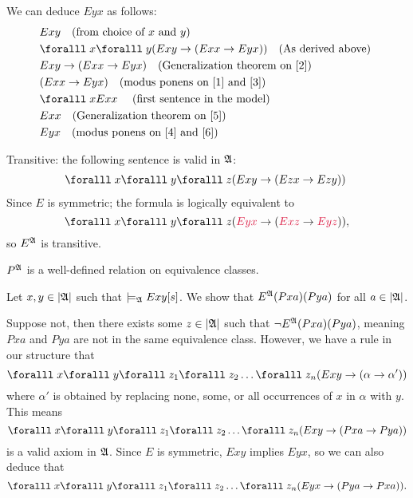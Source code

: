 \begin{Answer}
\begin{enumalph}
\begin{enumroman}
          We can deduce $Eyx$ as follows:
          \begin{align}
            &Exy \quad \text{(from choice of $x$ and $y$)} ~\label{1} \\
            &\forall x \forall y (Exy \lto (Exx \lto Eyx)) \quad \text{(As derived above)} ~\label{2} \\
            &Exy \lto (Exx \lto Eyx) \quad \text{(Generalization theorem on ~\ref{2})} ~\label{3} \\
            &(Exx \lto Eyx) \quad \text{(modus ponens on ~\ref{1} and ~\ref{3})} ~\label{4} \\
            &\forall x Exx ~\label{5} \quad \text{(first sentence in the model)}\\
            &Exx \quad \text{(Generalization theorem on ~\ref{5})} ~\label{6} \\
            &Eyx  \quad \text{(modus ponens on ~\ref{4} and ~\ref{6})} ~\label{7}
          \end{align}
        \newpage
        \item Transitive:
          the following sentence is valid in $\mathfrak{A}$:
          \begin{align}
            \forall x \forall y \forall z (Exy \lto (Ezx \lto Ezy))~\label{eq:27.1}
          \end{align}
          Since $E$ is symmetric;
          the formula is logically equivalent to
          \[ \forall x \forall y \forall z (\crim{Eyx} \lto (\crim{Exz} \lto \crim{Eyz})), \]
          so $E^{\mathfrak{A}}$ is transitive.
      \end{enumroman}
    \item $P^{\mathfrak{A}}$ is a well-defined relation on equivalence classes.
    
      \step
      Let $x, y \in \lvert\mathfrak{A}\rvert$ such that $\models_{\mathfrak{A}} E xy[s]$.
      We show that $E^{\mathfrak{A}} (P xa) (P ya)$ for all $a \in \lvert\mathfrak{A}\rvert$.

      \step
      Suppose not, then there exists some $z \in \lvert\mathfrak{A}\rvert$ such that
      $\lnot E^{\mathfrak{A}} (P xa) (P ya)$, meaning $P xa$ and $P ya$ are not
      in the same equivalence class.
      However, we have a rule in our structure that
      \[ \forall x \forall y \forall z_1 \forall z_2 \ldots \forall z_n
      (Exy \lto (\alpha \lto \alpha')) \] where $\alpha'$ is obtained by
      replacing none, some, or all occurrences of $x$ in $\alpha$ with $y$.
      This means
      \[ \forall x \forall y \forall z_1 \forall z_2 \ldots \forall z_n
      (Exy \lto (P xa \lto P ya)) \] is a valid axiom in $\mathfrak{A}$.
      Since $E$ is symmetric, $Exy$ implies $Eyx$, so
      we can also deduce that
      \[ 
        \forall x \forall y \forall z_1 \forall z_2 \ldots \forall z_n
        (Eyx \lto (P ya \lto P xa)).
      \]


\end{enumalph}
\end{Answer}
